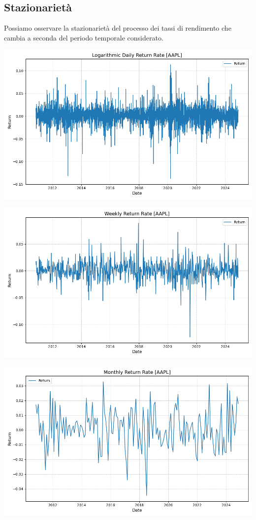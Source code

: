 \documentclass[compress]{beamer}
\begin{document}
\subsection{Stazionarietà}
\begin{frame}{\subsecname}
	Possiamo osservare la stazionarietà del processo dei tassi di rendimento che cambia a seconda del periodo temporale considerato. 
	\begin{minipage}{0.49\textwidth}
		\centering
		\includegraphics[width=0.8\linewidth]{images/Logarithmic Daily Return Rate [AAPL].png}
	\end{minipage}
	\hfill
	\begin{minipage}{0.49\textwidth}
		\centering
		\includegraphics[width=0.8\linewidth]{images/Weekly Return Rate [AAPL].png}
	\end{minipage}
	\vspace{-0.5cm}
	\begin{center}
		\begin{minipage}{0.5\textwidth}
			\centering
			\includegraphics[width=0.8\linewidth]{images/Monthly Return Rate [AAPL].png}
		\end{minipage}
	\end{center}
\end{frame}
\end{document}
